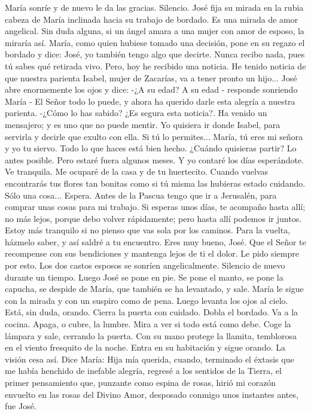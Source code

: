 \documentclass[12pt]{book} %
\begin{document}
María sonríe y de nuevo le da las gracias. Silencio. José fija su mirada en la rubia cabeza de María inclinada hacia su trabajo de bordado. Es una mirada de amor angelical. Sin duda alguna, si un ángel amara a una mujer con amor de esposo, la miraría así. 
María, como quien hubiese tomado una decisión, pone en su regazo el bordado y dice: 
José, yo también tengo algo que decirte. Nunca recibo nada, pues tú sabes qué retirada vivo. Pero, hoy he recibido 
una noticia. He tenido noticia de que nuestra parienta Isabel, mujer de Zacarías, va a tener pronto un hijo... José abre enormemente los ojos y dice: 
-¿A su edad? 
A su edad - responde sonriendo María - El Señor todo lo puede, y ahora ha querido darle esta alegría a nuestra 
parienta. 
-¿Cómo lo has sabido? ¿Es segura esta noticia?. 
Ha venido un mensajero; y es uno que no puede mentir. Yo quisiera ir donde Isabel, para servirla y decirle que exulto 
con ella. Si tú lo permites... 
María, tú eres mi señora y yo tu siervo. Todo lo que haces está bien hecho. ¿Cuándo quisieras partir? 
Lo antes posible. Pero estaré fuera algunos meses. 
Y yo contaré los días esperándote. Ve tranquila. Me ocuparé de la casa y de tu huertecito. Cuando vuelvas encontrarás 
tus flores tan bonitas como si tú misma las hubieras estado cuidando. Sólo una cosa... Espera. Antes de la Pascua tengo que ir a Jerusalén, para comprar unas cosas para mi trabajo. Si esperas unos días, te acompaño hasta allí; no más lejos, porque debo volver rápidamente; pero hasta allí podemos ir juntos. Estoy más tranquilo si no pienso que vas sola por los caminos. Para la vuelta, házmelo saber, y así saldré a tu encuentro. 
Eres muy bueno, José. Que el Señor te recompense con sus bendiciones y mantenga lejos de ti el dolor. Le pido 
siempre por esto. 
Los dos castos esposos se sonríen angelicalmente. Silencio de nuevo durante un tiempo. 
Luego José se pone en pie. Se pone el manto, se pone la capucha, se despide de María, que también se ha levantado, y 
sale. 
María le sigue con la mirada y con un suspiro como de pena. Luego levanta los ojos al cielo. Está, sin duda, orando. Cierra la puerta con cuidado. Dobla el bordado. Va a la cocina. Apaga, o cubre, la lumbre. Mira a ver si todo está como debe. Coge la lámpara y sale, cerrando la puerta. Con su mano protege la llamita, temblorosa en el viento fresquito de la noche. Entra en su habitación y sigue orando. 
La visión cesa así. 
Dice María: 
Hija mía querida, cuando, terminado el éxtasis que me había henchido de inefable alegría, regresé a los sentidos de la Tierra, el primer pensamiento que, punzante como espina de rosas, hirió mi corazón envuelto en las rosas del Divino Amor, desposado conmigo unos instantes antes, fue José. 
\end{document}

